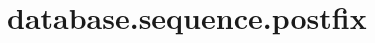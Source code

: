 \section{database.sequence.postfix}
\label{configuration:DatabaseSequencePostfix}
\AvailableInJavaOnly{\TODO}